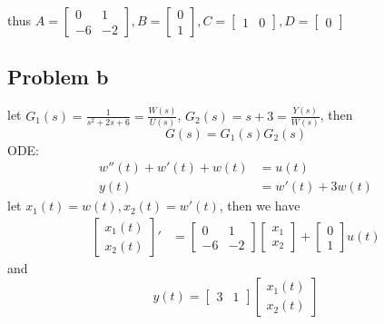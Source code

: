 \documentclass[12pt,a4paper]{article}
\begin{document}
thus
$
    A =
    \begin{bmatrix}
        0  & 1  \\
        -6 & -2
    \end{bmatrix},
    B =
    \begin{bmatrix}
        0 \\
        1
    \end{bmatrix},
    C = \begin{bmatrix}
        1 & 0
    \end{bmatrix},
    D =
    \begin{bmatrix}
        0
    \end{bmatrix}
$

\subsection{Problem b}
let $G_1(s)=\frac{1}{s^2+2s+6}=\frac{W(s)}{U(s)}$, $G_2(s)=s+3=\frac{Y(s)}{W(s)}$, then
\[G(s)  = G_1(s)G_2(s) \]
ODE:
\begin{equation}
    \begin{aligned}
        w''(t) + w'(t) + w(t) & = u(t)    \\
        y(t)            & = w'(t) + 3w(t)
    \end{aligned}
\end{equation}
let $ x_1(t) = w(t), x_2(t) = w'(t)$, then we have
\begin{equation}
    \begin{aligned}
        \begin{bmatrix}
            {x_1(t)} \\
            {x_2(t)}
        \end{bmatrix}' & = \begin{bmatrix}
                               0  & 1  \\
                               -6 & -2
                           \end{bmatrix} \begin{bmatrix}
                                             x_1 \\
                                             x_2
                                         \end{bmatrix} + \begin{bmatrix}
                                                             0 \\
                                                             1
                                                         \end{bmatrix} u(t)
    \end{aligned}
\end{equation}
and
\[ y(t) = \begin{bmatrix}
        3 & 1
    \end{bmatrix} \begin{bmatrix}
                      x_1(t) \\
                      x_2(t)
                  \end{bmatrix} \]
\end{document}
